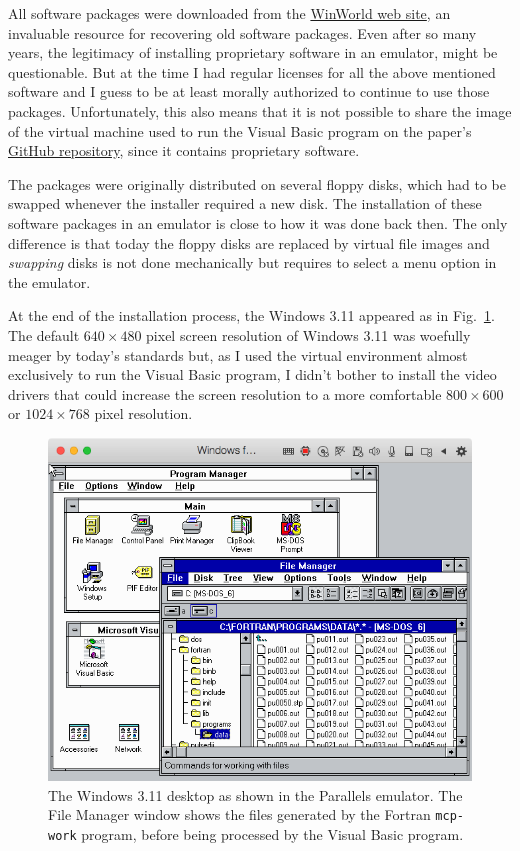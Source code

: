All software packages were downloaded from the \href{https://winworldpc.com}{WinWorld web site}, an invaluable resource for recovering old software packages. 
Even after so many years, the legitimacy of installing proprietary software in an emulator, might be questionable. But at the time I had regular licenses for all the above mentioned software and I guess to be at least morally authorized to continue to use those packages.
Unfortunately, this also means that it is not possible to share the image of the virtual machine used to run the Visual Basic program on the paper's \href{https://github.com/sabinomaggi/ten-years-challenge-pulsed-drive}{GitHub repository}, since it contains proprietary software.

The packages were originally distributed on several floppy disks, which had to be swapped whenever the installer required a new disk. 
The installation of these software packages in an emulator is close to how it was done back then.
The only difference is that today the floppy disks are replaced by virtual file images and \emph{swapping} disks is not done mechanically but requires to select a menu option in the emulator.

At the end of the installation process, the Windows 3.11 appeared as in Fig.~\ref{fig:windows-311}.
The default $640 \times 480$ pixel screen resolution of Windows 3.11 was woefully meager by today's standards but, as I used the virtual environment almost exclusively to run the Visual Basic program, I didn't bother to install the video drivers that could increase the screen resolution to a more comfortable $800 \times 600$ or $1024 \times 768$ pixel resolution.

\begin{figure}[t]
	\centering
	\includegraphics[width = 0.75 \textwidth]{images/windows-311.png}
	\caption{The Windows 3.11 desktop as shown in the Parallels emulator. The File Manager window shows the files generated by the Fortran \texttt{mcp-work} program, before being processed by the Visual Basic program.}
	\label{fig:windows-311}
\end{figure}


